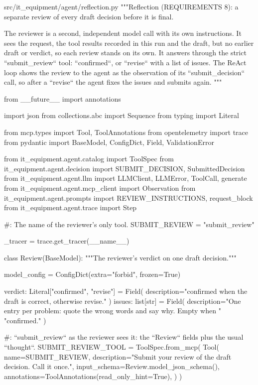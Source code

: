 \documentclass[11pt,letterpaper]{article}
\renewcommand{\_}{\textunderscore\allowbreak}
\begin{document}
\begin{codebox}{src/it_equipment/agent/reflection.py}
"""Reflection (REQUIREMENTS 8): a separate review of every draft decision before it is final.

The reviewer is a second, independent model call with its own instructions. It sees the
request, the tool results recorded in this run and the draft, but no earlier draft or verdict,
so each review stands on its own. It answers through the strict ``submit_review`` tool:
``confirmed``, or ``revise`` with a list of issues. The ReAct loop shows the review to the
agent as the observation of its ``submit_decision`` call, so after a ``revise`` the agent fixes
the issues and submits again.
"""

from __future__ import annotations

import json
from collections.abc import Sequence
from typing import Literal

from mcp.types import Tool, ToolAnnotations
from opentelemetry import trace
from pydantic import BaseModel, ConfigDict, Field, ValidationError

from it_equipment.agent.catalog import ToolSpec
from it_equipment.agent.decision import SUBMIT_DECISION, SubmittedDecision
from it_equipment.agent.llm import LLMClient, LLMError, ToolCall, generate
from it_equipment.agent.mcp_client import Observation
from it_equipment.agent.prompts import REVIEW_INSTRUCTIONS, request_block
from it_equipment.agent.trace import Step

#: The name of the reviewer's only tool.
SUBMIT_REVIEW = "submit_review"

_tracer = trace.get_tracer(__name__)


class Review(BaseModel):
    """The reviewer's verdict on one draft decision."""

    model_config = ConfigDict(extra="forbid", frozen=True)

    verdict: Literal["confirmed", "revise"] = Field(
        description="confirmed when the draft is correct, otherwise revise."
    )
    issues: list[str] = Field(
        description="One entry per problem: quote the wrong words and say why. Empty when "
        "confirmed."
    )


#: ``submit_review`` as the reviewer sees it: the ``Review`` fields plus the usual ``thought``.
SUBMIT_REVIEW_TOOL = ToolSpec.from_mcp(
    Tool(
        name=SUBMIT_REVIEW,
        description="Submit your review of the draft decision. Call it once.",
        input_schema=Review.model_json_schema(),
        annotations=ToolAnnotations(read_only_hint=True),
    )
)



\end{codebox}
\end{document}

